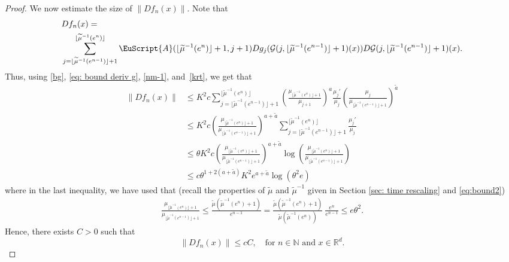 \documentclass[reqno, a4paper, 10pt]{amsart}
\theoremstyle{plain}
\numberwithin{equation}{section}
\theoremstyle{remark}
\def\N{\mathbb{N}}
\def\cA{\EuScript{A}}
\def\R{\mathbb{R}}
\begin{document}
\begin{proof}
We now estimate the size of $\|Df_n(x)\|$. Note that
\[
\begin{split}
&Df_n(x)=\\
&\sum_{j=\lfloor \widetilde{\mu}^{-1}(e^{n-1})\rfloor+1}^{\lfloor \widetilde{\mu}^{-1}(e^{n})\rfloor}\cA(\lfloor \widetilde{\mu}^{-1}(e^{n})\rfloor+1, j+1)Dg_j (\mathcal G(j, \lfloor \widetilde{\mu}^{-1}(e^{n-1})\rfloor+1)(x))D\mathcal G(j, \lfloor \widetilde{\mu}^{-1}(e^{n-1})\rfloor+1)(x).
\end{split}
\]
Thus, using \eqref{bg}, \eqref{eq: bound deriv g}, \eqref{nm-1}, and~\eqref{krt}, we get that 
\begin{equation*}\label{dfnx}
\begin{split}
\|Df_n(x)\| &\le K^2 c\sum_{j=\lfloor \widetilde{\mu}^{-1}(e^{n-1})\rfloor+1}^{\lfloor \widetilde{\mu}^{-1}(e^{n})\rfloor}\left (\frac{\mu_{\lfloor \widetilde{\mu}^{-1}(e^{n})\rfloor+1}}{\mu_{j+1}}\right )^a  \frac{\mu_j'}{\mu_j} \left (\frac{\mu_j}{\mu_{\lfloor \widetilde{\mu}^{-1}(e^{n-1})\rfloor+1}}\right)^{\tilde a} \\
&\le K^2c\left (\frac{\mu_{\lfloor \widetilde{\mu}^{-1}(e^{n})\rfloor+1}}{\mu_{\lfloor \widetilde{\mu}^{-1}(e^{n-1})\rfloor+1}}\right )^{a+\tilde a}\sum_{j=\lfloor \widetilde{\mu}^{-1}(e^{n-1})\rfloor+1}^{\lfloor \widetilde{\mu}^{-1}(e^{n})\rfloor}\frac{\mu_j'}{\mu_j} \\
&\le \theta K^2c\left (\frac{\mu_{\lfloor \widetilde{\mu}^{-1}(e^{n})\rfloor+1}}{\mu_{\lfloor \widetilde{\mu}^{-1}(e^{n-1})\rfloor+1}}\right )^{a+\tilde a}\log \left (\frac{\mu_{\lfloor \widetilde{\mu}^{-1}(e^{n})\rfloor+1}}{\mu_{\lfloor \widetilde{\mu}^{-1}(e^{n-1})\rfloor+1}}\right ) \\
&\le c\theta^{1+2(a+\tilde a)}K^2 e^{a+\tilde a}\log (\theta^2 e)
\end{split}
\end{equation*} 
where in the last inequality, we have used that (recall the properties of $\widetilde{\mu}$ and $\widetilde{\mu}^{-1}$ given in Section \ref{sec: time rescaling} and \eqref{eq:bound2})
\begin{equation}\label{eq: aux mu mu tilde inverse}
\begin{split}
\frac{\mu_{\lfloor \widetilde{\mu}^{-1}(e^{n})\rfloor+1}}{\mu_{\lfloor \widetilde{\mu}^{-1}(e^{n-1})\rfloor+1}} \le \frac{\widetilde{\mu}(\widetilde{\mu}^{-1}(e^n)+1)}{e^{n-1}}=\frac{\widetilde{\mu}(\widetilde{\mu}^{-1}(e^n)+1)}{\widetilde{\mu}(\widetilde{\mu}^{-1}(e^n))} \ \frac{e^{n}}{e^{n-1}}\le e\theta^2.
\end{split}
\end{equation}
Hence, there exists $C>0$ such that 
\begin{equation*}\label{8-3-7}
    \|Df_n(x)\| \le cC, \quad \text{for $n\in \N$ and $x\in \R^d$.}
\end{equation*}


\end{proof}
\end{document}
